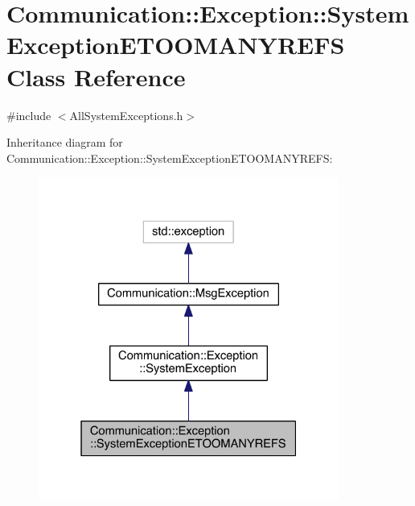 \hypertarget{class_communication_1_1_exception_1_1_system_exception_e_t_o_o_m_a_n_y_r_e_f_s}{}\section{Communication\+:\+:Exception\+:\+:System\+Exception\+E\+T\+O\+O\+M\+A\+N\+Y\+R\+E\+F\+S Class Reference}
\label{class_communication_1_1_exception_1_1_system_exception_e_t_o_o_m_a_n_y_r_e_f_s}


{\ttfamily \#include $<$All\+System\+Exceptions.\+h$>$}



Inheritance diagram for Communication\+:\+:Exception\+:\+:System\+Exception\+E\+T\+O\+O\+M\+A\+N\+Y\+R\+E\+F\+S\+:\nopagebreak
\begin{figure}[H]
\begin{center}
\leavevmode
\includegraphics[width=280pt]{class_communication_1_1_exception_1_1_system_exception_e_t_o_o_m_a_n_y_r_e_f_s__inherit__graph}
\end{center}
\end{figure}


